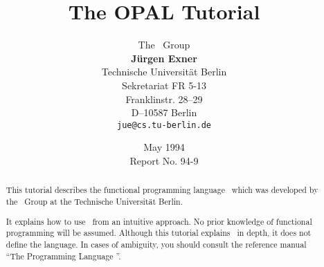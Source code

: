 


\title{\Huge \bf The O{\LARGE\bf PAL} Tutorial}
\author{\Large The \opal\ Group\\[2ex]
{\bf J\"urgen Exner}\\[8ex]
Technische Universit\"at Berlin\\
Sekretariat FR 5-13\\
Franklinstr. 28--29\\
D--10587 Berlin\\[3ex]
\verb+jue@cs.tu-berlin.de+}
\date{
\vspace*{1cm}
May 1994\\[10ex]
  Report No. 94-9}


\maketitle

\begin{abstract}
This tutorial describes the functional programming language \opal\
which was     
developed by the \opal\ Group at the Technische Universit\"at
Berlin.

It explains how to use \opal\ from an intuitive approach. No prior
knowledge of functional programming will be assumed.
Although this tutorial explains \opal\ in depth, it does not define
the language.
 In cases of ambiguity, you should consult the reference manual ``The Programming
Language \opal''. 
\end{abstract}

\tableofcontents









\appendix






